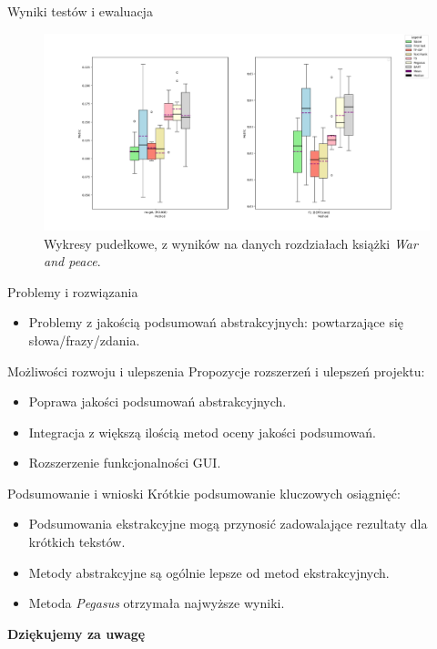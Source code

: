 \documentclass[aspectratio=169,xcolor=dvipsnames]{beamer}
\begin{document}

\begin{frame}{Wyniki testów i ewaluacja}
    \begin{figure}
    \includegraphics[width=0.8\linewidth]{war_and_peace.png}
    \caption{Wykresy pudełkowe, z wyników na danych rozdziałach książki
    \textit{War and peace}.}
    \end{figure}
\end{frame}


\begin{frame}{Problemy i rozwiązania}
    \begin{itemize}
        \item Problemy z jakością podsumowań abstrakcyjnych: powtarzające się słowa/frazy/zdania.
    \end{itemize}
\end{frame}


\begin{frame}{Możliwości rozwoju i ulepszenia}
    Propozycje rozszerzeń i ulepszeń projektu:
    \begin{itemize}
        \item Poprawa jakości podsumowań abstrakcyjnych.
        \item Integracja z większą ilością metod oceny jakości podsumowań.
        \item Rozszerzenie funkcjonalności GUI.
    \end{itemize}
\end{frame}


\begin{frame}{Podsumowanie i wnioski}
    Krótkie podsumowanie kluczowych osiągnięć:
    \begin{itemize}
        \item Podsumowania ekstrakcyjne mogą przynosić zadowalające rezultaty dla krótkich tekstów.
        \item Metody abstrakcyjne są ogólnie lepsze od metod ekstrakcyjnych.
        \item Metoda \textit{Pegasus} otrzymała najwyższe wyniki.
    \end{itemize}
\end{frame}


\begin{frame}
    \Huge{\centerline{\textbf{Dziękujemy za uwagę}}}
\end{frame}

\end{document}
